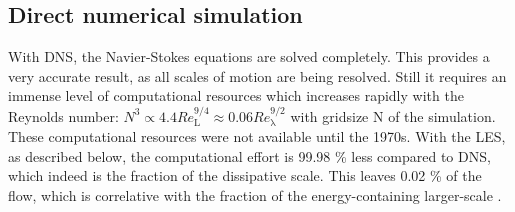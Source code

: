 \documentclass[11pt,a4paper,openany,oneside,parskip=half*]{article}
\begin{document}
\subsection{Direct numerical simulation}
With DNS, the Navier-Stokes equations are solved completely. This provides a very accurate result, as all scales of motion are being resolved. Still it requires an immense level of computational resources which increases rapidly with the Reynolds number: $N^3 \propto 4.4 Re_{\mathrm{L}}^{9/4} \approx 0.06 Re_{\mathrm{\lambda}}^{9/2}$ with gridsize N of the simulation. These computational resources were not available until the 1970s. With the LES, as described below, the computational effort is 99.98 \% less compared to DNS, which indeed is the fraction of the dissipative scale. This leaves 0.02 \% of the flow, which is correlative with the fraction of the energy-containing larger-scale \cite{turbulentFlows}.
\newline
\end{document}
